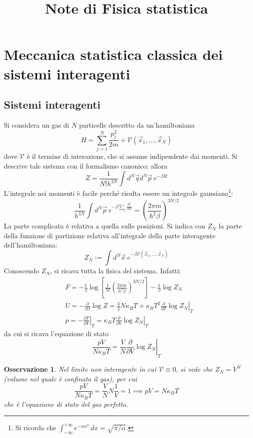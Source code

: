 \documentclass[11pt, a4paper]{scrartcl}
\title{Note di Fisica statistica}
\author{}
\date{}
\theoremstyle{style}
\newtheorem{osservazione}{Osservazione}[section]
\theoremstyle{style1}
\renewcommand{\maketitle}{
\begin{center}
{\sffamily
{\fontsize{20}{20}\selectfont\MakeUppercase\thetitle}}

\vspace{0.2in}

{\large\scshape\sffamily\theauthor}
\end{center}
}
\newcommand*\Eval[3]{\left.#1\right\rvert_{#2}^{#3}}
\numberwithin{equation}{subsection}
\begin{document}
\maketitle
\newpage
\tableofcontents 
\newpage
\section{Meccanica statistica classica dei sistemi interagenti}
\subsection{Sistemi interagenti}
Si considera un gas di $N$ particelle descritto da un'hamiltoniana 
\[
H = \sum_{j=1}^{N} \frac{p_j^2}{2m} + \mathcal{V} (\vec{x}_1,\ldots,\vec{x}_N)
\] 
dove $\mathcal{V}$ \`e il termine di interazione, che si assume indipendente dai momenti.
Si descrive tale sistema con il formalismo canonico; allora
\[
Z = \frac{1}{N! h^{3N}} \int d^N \vec{q} d^N \vec{p} \ e^{- \beta  H} 
\] 
L'integrale nei momenti \`e facile perch\'e risulta essere un integrale gaussiano\footnote{Si ricorda che $\int_{-\infty} ^{+\infty} e^{-\alpha x^2} \ dx = \sqrt{\pi / \alpha } $.}:
\[
\frac{1}{h^{3N} } \int d^N \vec{p} \ e^{-\beta  \sum_{j}^{} \frac{p^2_i}{2m}}  = \left(\frac{2\pi m }{h^2 \beta }\right) ^{3N / 2} 
\] 
La parte complicata \`e relativa a quella sulle posizioni. 
Si indica con $Z_N$ la parte della funzione di partizione relativa all'integrale della parte interagente dell'hamiltoniana:
\[
Z_N := \int d^N \vec{x} \ e^{-\beta  \mathcal{V} (\vec{x}_1,\ldots,\vec{x}_N)} 
\] 
Conoscendo $Z_N$, si ricava tutta la fisica del sistema. 
Infatti:
\[
\begin{split}
	&F= -\frac{1}{\beta }\log \left[\frac{1}{N!}\left(\frac{2\pi m }{h^2 \beta }\right)^{3N / 2}  \right]  - \frac{1}{\beta }\log Z_N\\
	& U = - \frac{\partial }{\partial \beta } \log Z = \frac{3}{2} N \kappa _B T + \kappa _B T^2 \Eval{\frac{\partial }{\partial T} \log Z_N}{T}{}\\
	& p = \Eval{- \frac{\partial F}{\partial V}}{T}{} = \kappa _B T \Eval{\frac{\partial }{\partial V} \log Z_N}{T}{}
\end{split}
\] 
da cui si ricava l'equazione di stato 
\begin{equation}\label{1-steq}
	\frac{pV}{N\kappa _B T} = \frac{V}{N} \Eval{\frac{\partial }{\partial V} \log Z_N}{T}{}
\end{equation}
\begin{osservazione}
Nel limite non interagente in cui $\mathcal{V} \equiv 0$, si vede che $Z_N = V^N$ (volume nel quale \`e confinato il gas), per cui
\[
\frac{pV}{N\kappa _B T} = \frac{V}{N}N \frac{1}{V}= 1 \implies pV = N \kappa _B T
\] 
che \`e l'equazione di stato del gas perfetto.
\end{osservazione}
\end{document}
